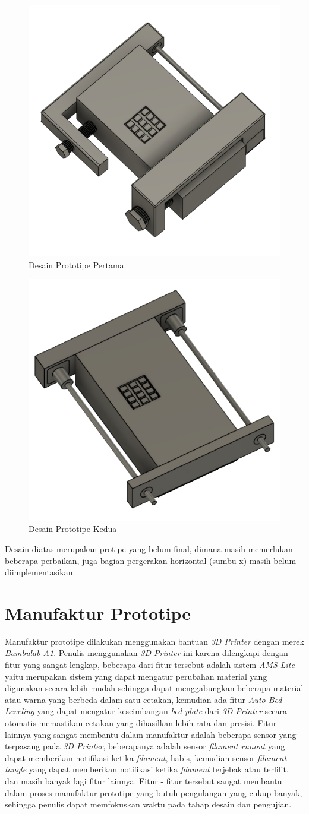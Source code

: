 \begin{figure}[H]
    \centering
    \includegraphics[width=0.4\linewidth]{gambar/prototype-2.png}
    \caption{Desain Prototipe Pertama}
    \label{fig:desain-prototipe-2}
\end{figure}

\begin{figure}[H]
  \centering
  \includegraphics[width=0.4\linewidth]{gambar/prototype-3.png}
  \caption{Desain Prototipe Kedua}
  \label{fig:desain-prototipe-3}
\end{figure}

Desain diatas merupakan protipe yang belum final, dimana masih memerlukan beberapa perbaikan, 
juga bagian pergerakan horizontal (sumbu-x) masih belum diimplementasikan.

\section{Manufaktur Prototipe}

Manufaktur prototipe dilakukan menggunakan bantuan \textit{3D Printer} dengan merek 
\textit{Bambulab A1}. Penulis menggunakan \textit{3D Printer} ini karena dilengkapi dengan fitur yang
sangat lengkap, beberapa dari fitur tersebut adalah
sistem \textit{AMS Lite} yaitu merupakan sistem yang dapat mengatur perubahan material yang digunakan
secara lebih mudah sehingga dapat menggabungkan beberapa material atau warna yang berbeda dalam satu cetakan,
kemudian ada fitur \textit{Auto Bed Leveling} yang dapat mengatur keseimbangan \textit{bed plate} 
dari \textit{3D Printer} secara otomatis memastikan cetakan yang dihasilkan lebih rata dan presisi.
Fitur lainnya yang sangat membantu dalam manufaktur adalah beberapa sensor yang terpasang pada \textit{3D Printer},
beberapanya adalah sensor \textit{filament runout} yang dapat memberikan notifikasi ketika \textit{filament},
habis, kemudian sensor \textit{filament tangle} yang dapat memberikan notifikasi ketika \textit{filament}
terjebak atau terlilit, dan masih banyak lagi fitur lainnya.
Fitur - fitur tersebut sangat membantu dalam proses manufaktur prototipe yang butuh pengulangan
yang cukup banyak, sehingga penulis dapat memfokuskan waktu pada tahap desain dan pengujian.

